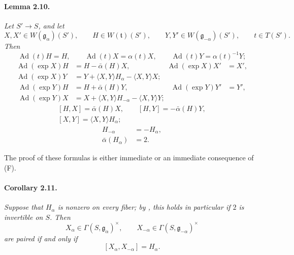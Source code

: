 \paragraph{\textbf{Lemma 2.10.}}
\emph{Let \(S'\to S\), and let}
\[
  X,X'\in W(\mathfrak g_\alpha)(S'),\qquad
  H\in W(\mathfrak t)(S'),\qquad
  Y,Y'\in W(\mathfrak g_{-\alpha})(S'),\qquad
  t\in T(S').
\]
\emph{Then}
\[
\tag{1}\label{sga3:xx:lemma:2-10:equation:1}
  \operatorname{Ad}(t)H=H,\qquad
  \operatorname{Ad}(t)X=\alpha(t)X,\qquad
  \operatorname{Ad}(t)Y=\alpha(t)^{-1}Y;
\]
\[
  \tag{2}\label{sga3:xx:lemma:2-10:equation:2}
\begin{aligned}
  \operatorname{Ad}(\exp X)H
    &=H-\bar\alpha(H)X,&
  \operatorname{Ad}(\exp X)X'&=X',\\
  \operatorname{Ad}(\exp X)Y
    &=Y+\langle X,Y\rangle H_\alpha
        -\langle X,Y\rangle X;
\end{aligned}
\]
\[
  \tag{2'}\label{sga3:xx:lemma:2-10:equation:2-prime}
\begin{aligned}
  \operatorname{Ad}(\exp Y)H
    &=H+\bar\alpha(H)Y,&
  \operatorname{Ad}(\exp Y)Y'&=Y',\\
  \operatorname{Ad}(\exp Y)X
    &=X+\langle X,Y\rangle H_{-\alpha}
        -\langle X,Y\rangle Y;
\end{aligned}
\]
\[
\tag{3}\label{sga3:xx:lemma:2-10:equation:3}
\begin{gathered}
  [H,X]=\bar\alpha(H)X,\qquad
  [H,Y]=-\bar\alpha(H)Y,\\
  [X,Y]=\langle X,Y\rangle H_\alpha;
\end{gathered}
\]
\begin{align}
  H_{-\alpha}&=-H_\alpha, \tag{4}\label{sga3:xx:lemma:2-10:equation:4}\\
  \bar\alpha(H_\alpha)&=2. \tag{5}\label{sga3:xx:lemma:2-10:equation:5}
\end{align}

The proof of these formulas is either immediate or an immediate
consequence of \textup{(F)}.

\paragraph{\textbf{Corollary 2.11.}}
\emph{Suppose that \(H_\alpha\) is nonzero on every fiber; by
\textup{}, this holds in particular if \(2\) is invertible on
\(S\). Then}
\[
  X_\alpha\in\Gamma(S,\mathfrak g_\alpha)^\times,\qquad
  X_{-\alpha}\in\Gamma(S,\mathfrak g_{-\alpha})^\times
\]
\emph{are paired if and only if}
\[
  [X_\alpha,X_{-\alpha}]=H_\alpha.
\]

